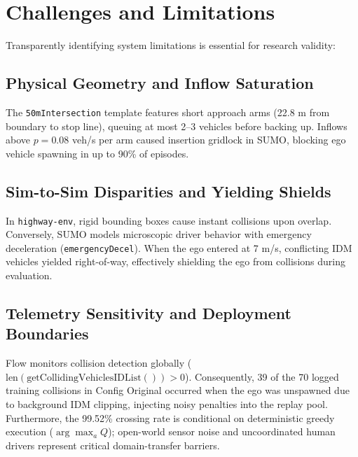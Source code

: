 \chapter{Challenges and Limitations}
\label{ch:limitations}

Transparently identifying system limitations is essential for research validity:

\vspace{-0.2cm}
\section{Physical Geometry and Inflow Saturation}
The \texttt{50mIntersection} template features short approach arms (22.8 m from boundary to stop line), queuing at most 2--3 vehicles before backing up. Inflows above $p = 0.08$ veh/s per arm caused insertion gridlock in SUMO, blocking ego vehicle spawning in up to 90\% of episodes.

\vspace{-0.2cm}
\section{Sim-to-Sim Disparities and Yielding Shields}
In \texttt{highway-env}, rigid bounding boxes cause instant collisions upon overlap. Conversely, SUMO models microscopic driver behavior with emergency deceleration (\texttt{emergencyDecel}). When the ego entered at 7 m/s, conflicting IDM vehicles yielded right-of-way, effectively shielding the ego from collisions during evaluation.

\vspace{-0.2cm}
\section{Telemetry Sensitivity and Deployment Boundaries}
Flow monitors collision detection globally ($\text{len}(\text{getCollidingVehiclesIDList}()) > 0$). Consequently, 39 of the 70 logged training collisions in Config Original occurred when the ego was unspawned due to background IDM clipping, injecting noisy penalties into the replay pool. Furthermore, the 99.52\% crossing rate is conditional on deterministic greedy execution ($\arg\max_a Q$); open-world sensor noise and uncoordinated human drivers represent critical domain-transfer barriers.
